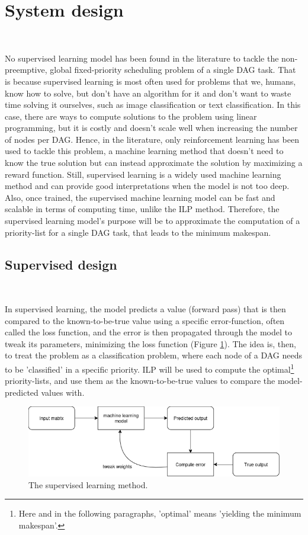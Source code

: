 \section{System design}
\label{sec:system_design}
~

No supervised learning model has been found in the literature to 
tackle the non-preemptive, global fixed-priority scheduling problem of a single DAG task.
That is because supervised learning is most often used for problems
that we, humans, know how to solve, but don't have an algorithm for it
and don't want to waste time solving it ourselves,
such as image classification or text classification.
In this case, there are ways to compute solutions to the problem
using linear programming, but it is costly and doesn't scale well 
when increasing the number of nodes per DAG.
Hence, in the literature, only reinforcement learning has been
used to tackle this problem, a machine learning method that 
doesn't need to know the true solution but 
can instead approximate the solution by maximizing a reward function.
Still, supervised learning is a widely used machine learning method
and can provide good interpretations when the model is not too deep.
Also, once trained, the supervised machine learning model can be 
fast and scalable in terms of computing time, unlike the ILP method.
Therefore, the supervised learning model's purpose will be to
approximate the computation of a priority-list for a single DAG task, 
that leads to the minimum makespan.

\subsection{Supervised design}
~

In supervised learning, 
the model predicts a value (forward pass) that is then compared to the known-to-be-true value using a
specific error-function, often called the loss function,
and the error is then propagated through the model to tweak its parameters, minimizing the loss function
(Figure \ref{fig:supervised_learning}).
The idea is, then, to treat the problem as a classification problem,
where each node of a DAG needs to be 'classified' in a specific priority.
ILP will be used to compute the optimal\footnote{Here and in the following paragraphs, 'optimal' means 'yielding the minimum makespan'.}
priority-lists, and use them as the known-to-be-true values to compare the model-predicted values with.


\begin{figure}
    \centering
    \includegraphics[width=\linewidth]{images/supervised_learning_diagram.drawio.png}
    \caption{The supervised learning method.}
    \label{fig:supervised_learning}
\end{figure}




